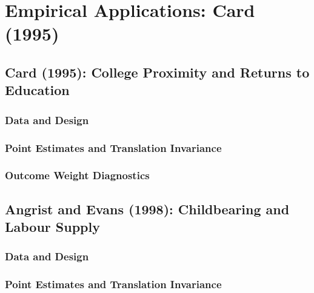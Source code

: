 \documentclass[12pt, a4paper, oneside]{article}
\theoremstyle{plain}
\theoremstyle{definition}
\begin{document}
\newpage
\section{Empirical Applications: Card (1995)}
\label{sec:card_ae}

\subsection{Card (1995): College Proximity and Returns to Education}
\label{subsec:card}

\subsubsection{Data and Design}


\subsubsection{Point Estimates and Translation Invariance}


\subsubsection{Outcome Weight Diagnostics}


\subsection{Angrist and Evans (1998): Childbearing and Labour Supply}
\label{subsec:ae}

\subsubsection{Data and Design}


\subsubsection{Point Estimates and Translation Invariance}
\end{document}
